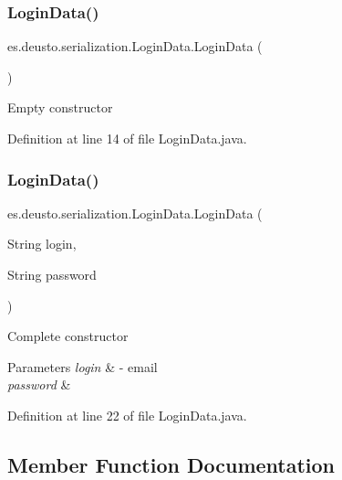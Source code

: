 \subsubsection{\texorpdfstring{Login\+Data()}{LoginData()}\hspace{0.1cm}{\footnotesize\ttfamily [1/2]}}
{\footnotesize\ttfamily es.\+deusto.\+serialization.\+Login\+Data.\+Login\+Data (\begin{DoxyParamCaption}{ }\end{DoxyParamCaption})}

Empty constructor 

Definition at line 14 of file Login\+Data.\+java.

\mbox{\label{classes_1_1deusto_1_1serialization_1_1_login_data_a38ab50660ffb0b1283f825c463b94dd4}} 
\subsubsection{\texorpdfstring{Login\+Data()}{LoginData()}\hspace{0.1cm}{\footnotesize\ttfamily [2/2]}}
{\footnotesize\ttfamily es.\+deusto.\+serialization.\+Login\+Data.\+Login\+Data (\begin{DoxyParamCaption}\item[{String}]{login,  }\item[{String}]{password }\end{DoxyParamCaption})}

Complete constructor 
\begin{DoxyParams}{Parameters}
{\em login} & -\/ email \\
\hline
{\em password} & \\
\hline
\end{DoxyParams}


Definition at line 22 of file Login\+Data.\+java.



\subsection{Member Function Documentation}
\mbox{\label{classes_1_1deusto_1_1serialization_1_1_login_data_a0e32fb64e6a069ddf5471b0ad9469e18}} 
